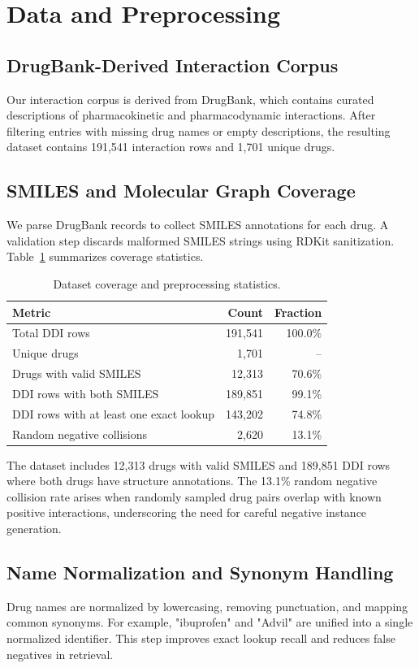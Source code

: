 \documentclass[conference]{IEEEtran}
\begin{document}
\section{Data and Preprocessing}
\subsection{DrugBank-Derived Interaction Corpus}
Our interaction corpus is derived from DrugBank, which contains curated descriptions of pharmacokinetic and pharmacodynamic interactions. After filtering entries with missing drug names or empty descriptions, the resulting dataset contains 191,541 interaction rows and 1,701 unique drugs.

\subsection{SMILES and Molecular Graph Coverage}
We parse DrugBank records to collect SMILES annotations for each drug. A validation step discards malformed SMILES strings using RDKit sanitization. Table~\ref{tab:coverage} summarizes coverage statistics.

\begin{table}[t]
    \centering
    \caption{Dataset coverage and preprocessing statistics.}
    \label{tab:coverage}
    \begin{tabular}{@{}lrr@{}}
    \toprule
    Metric & Count & Fraction \\
    \midrule
    Total DDI rows & 191,541 & 100.0\% \\
    Unique drugs & 1,701 & -- \\
    Drugs with valid SMILES & 12,313 & 70.6\% \\
    DDI rows with both SMILES & 189,851 & 99.1\% \\
    DDI rows with at least one exact lookup & 143,202 & 74.8\% \\
    Random negative collisions & 2,620 & 13.1\% \\
    \bottomrule
    \end{tabular}
\end{table}

The dataset includes 12,313 drugs with valid SMILES and 189,851 DDI rows where both drugs have structure annotations. The 13.1\% random negative collision rate arises when randomly sampled drug pairs overlap with known positive interactions, underscoring the need for careful negative instance generation.

\subsection{Name Normalization and Synonym Handling}
Drug names are normalized by lowercasing, removing punctuation, and mapping common synonyms. For example, "ibuprofen" and "Advil" are unified into a single normalized identifier. This step improves exact lookup recall and reduces false negatives in retrieval.
\end{document}
